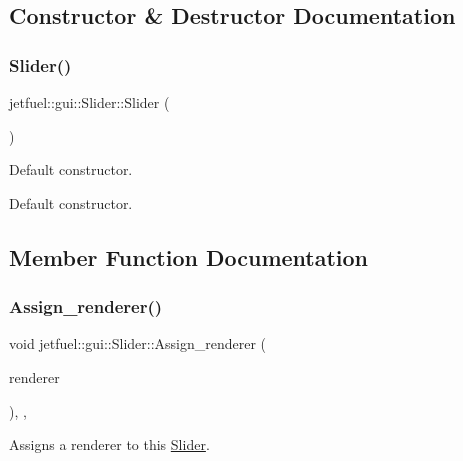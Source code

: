 \subsection{Constructor \& Destructor Documentation}
\mbox{\label{classjetfuel_1_1gui_1_1Slider_a961a11496cee6ab2f38aef1e14e94922}} 
\subsubsection{\texorpdfstring{Slider()}{Slider()}}
{\footnotesize\ttfamily jetfuel\+::gui\+::\+Slider\+::\+Slider (\begin{DoxyParamCaption}{ }\end{DoxyParamCaption})\hspace{0.3cm}{\ttfamily [inline]}}



Default constructor. 

Default constructor. 

\subsection{Member Function Documentation}
\mbox{\label{classjetfuel_1_1gui_1_1Slider_af9ceba04fec0f7cdc097ea0513094176}} 
\subsubsection{\texorpdfstring{Assign\+\_\+renderer()}{Assign\_renderer()}}
{\footnotesize\ttfamily void jetfuel\+::gui\+::\+Slider\+::\+Assign\+\_\+renderer (\begin{DoxyParamCaption}\item[{S\+D\+L\+\_\+\+Renderer $\ast$}]{renderer }\end{DoxyParamCaption})\hspace{0.3cm}{\ttfamily [inline]}, {\ttfamily [override]}, {\ttfamily [virtual]}}



Assigns a renderer to this \hyperlink{classjetfuel_1_1gui_1_1Slider}{Slider}. 

